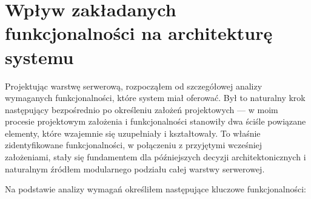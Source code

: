 \documentclass[a4paper,12pt,openany]{book}
\begin{document}
\section{Wpływ zakładanych funkcjonalności na architekturę systemu}

Projektując warstwę serwerową, rozpocząłem od szczegółowej analizy wymaganych funkcjonalności, które system miał oferować. Był to naturalny krok następujący bezpośrednio po określeniu założeń projektowych --- w moim procesie projektowym założenia i funkcjonalności stanowiły dwa ściśle powiązane elementy, które wzajemnie się uzupełniały i kształtowały. To właśnie zidentyfikowane funkcjonalności, w połączeniu z przyjętymi wcześniej założeniami, stały się fundamentem dla późniejszych decyzji architektonicznych i naturalnym źródłem modularnego podziału całej warstwy serwerowej.

Na podstawie analizy wymagań określiłem następujące kluczowe funkcjonalności:
\end{document}
